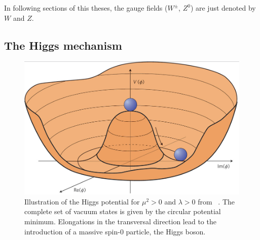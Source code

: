  In following sections of this theses, the gauge fields ($W^\pm$, $Z^0$) are just denoted by $W$ and $Z$.



 
\subsection{The Higgs mechanism}\label{Higgsm}
\begin{figure}[h]
	\centering
	\includegraphics[width=0.4\linewidth]{Pics/cp1/Higgs}
	\caption{Illustration of the Higgs potential for $\mu^2>0 $ and $\lambda>0$ from ~\cite{Ellis:2013jnq}. The complete set of vacuum states is given by the circular potential minimum. Elongations in the transversal direction lead to the introduction of a massive spin-0 particle, the Higgs boson.}
	
	\label{fig:Higgs}
\end{figure}

